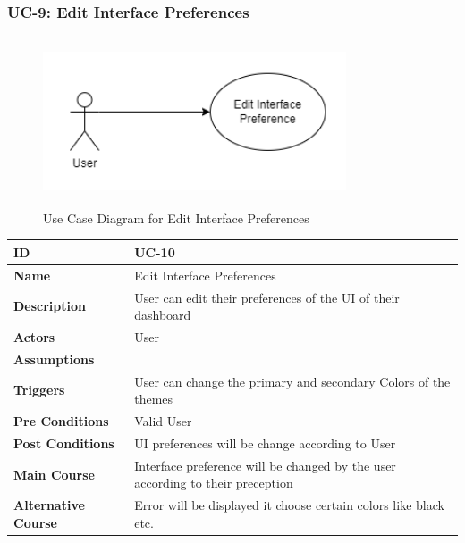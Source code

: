     \subsubsection{UC-9: Edit Interface Preferences}
    \begin{figure}[H]
        \includegraphics[height=5cm, width=0.8\textwidth]{./diagrams/Use Case/u9.png}
        \centering 
        \caption{Use Case Diagram for Edit Interface Preferences}
        \label{fig:Usecase1}
        \end{figure}
        
    \begin{center}
        \begin{tabularx}{\textwidth}{|l|X|}
            \hline
            \textbf{ID} & UC-10 \\
            \hline
            \textbf{Name} & Edit Interface Preferences \\
            \hline
            \textbf{Description} & User can edit their preferences of the UI of their dashboard \\
            \hline
            \textbf{Actors} & User \\
            \hline
            \textbf{Assumptions} &  \\
            \hline
            \textbf{Triggers} & User can change the primary and secondary Colors of the themes \\
            \hline
            \textbf{Pre Conditions} & Valid User \\
            \hline
            \textbf{Post Conditions} & UI preferences will be change according to User \\
            \hline
            \textbf{Main Course} & Interface preference will be changed by the user according to their preception  \\
            \hline
            \textbf{Alternative Course} & Error will be displayed it choose certain colors like black etc. \\
            \hline
            
        \end{tabularx}
    \end{center}
    \newpage
    

